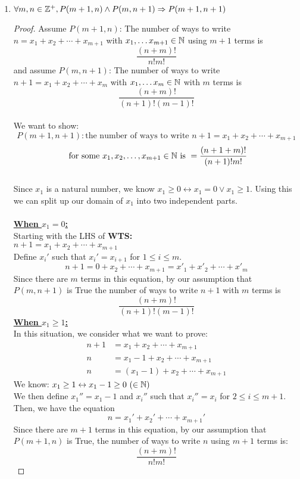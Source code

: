 \documentclass[12pt]{article}
\theoremstyle{definition}
\begin{document}
\begin{enumerate}
\begin{enumerate}[i]
        \item $\forall m, n \in \mathbb Z^+, P(m+1, n) \land P(m, n+1) \mathrel{\Rightarrow} P(m+1, n+1)$
            \begin{proof}
            Assume $P(m + 1,n)$: The number of ways to write $n = x_1 + x_2 + \cdots + x_{m+1}$ with $x_1, \dots x_{m+1} \in \mathbb N$ using $m+1$ terms is $$\frac{(n+m)!}{n!m!}$$ and assume $P(m, n+1)$: The number of ways to write $n + 1= x_1 + x_2 + \cdots + x_{m}$ with $x_1, \dots x_m \in \mathbb N$ with $m$ terms is $$\frac{(n + m)!}{(n+1)!(m-1)!}$$ \\
            We want to show:$$P(m+1, n+1): \text{the number of ways to write } n + 1 = x_1 + x_2 + \cdots + x_{m+1}$$ $$ \text{ for some } x_1, x_2, \ldots, x_{m+1} \in \mathbb N \text{ is } = \frac{(n+1+m)!}{(n+1)!m!}$$ \\ 
            Since $x_1$ is a natural number, we know $x_1 \geq 0 \leftrightarrow x_1 = 0 \lor x_1 \geq 1$. Using this we can split up our domain of $x_1$ into two independent parts. \\ 
            \\ 
            \textbf{\underline{When $x_1 = 0$:}} \\ 
            Starting with the LHS of \textbf{WTS:} \\ 
            $n + 1 = x_1 + x_2 + \cdots + x_{m+1}$ \\
            Define $x_i'$ such that $x_i' = x_{i+1}$ for $1 \leq i \leq m$.
            $$n + 1 = 0 + x_2 + \cdots + x_{m+1} = x'_1 + x'_2 + \cdots + x'_m$$
            Since there are $m$ terms in this equation, by our assumption that $P(m, n + 1)$ is True the number of ways to write $n + 1$ with $m$ terms is $$\frac{(n + m)!}{(n+1)!(m-1)!}$$
            \textbf{\underline{When $x_1 \geq 1$:}} \\
            In this situation, we consider what we want to prove:
            \begin{align*}
                n + 1 &= x_1 + x_2 + \cdots + x_{m+1}\\
                n &= x_1 - 1 + x_2 + \cdots + x_{m+1} \tag{subtracting 1 from both sides} \\
                n &= (x_1 - 1) + x_2 + \cdots + x_{m+1} 
            \end{align*}
            We know: $x_1 \geq 1 \leftrightarrow x_1 - 1 \geq 0 \text{ } (\in \mathbb N)$  \\
            We then define $x_1'' = x_1 - 1$ and $x_i''$ such that $x_i'' = x_{i}$ for $2 \leq i \leq m+1$. Then, we have the equation
            $$n = x_1' + x_2' + \cdots + x_{m+1}'$$
            Since there are $m+1$ terms in this equation, by our assumption that $P(m+1, n)$ is True, the number of ways to write $n$ using $m+1$ terms is: 
            $$\frac{(n+m)!}{n!m!}$$
            

\end{proof}
\end{enumerate}
\end{enumerate}
\end{document}
